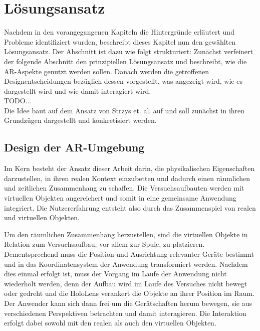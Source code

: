 \section{Lösungsansatz}
\label{sec-4}
Nachdem in den vorangegangenen Kapiteln die Hintergründe erläutert und Probleme identifiziert wurden, beschreibt dieses Kapitel nun den gewählten Lösungsansatz. Der Abschnitt ist dazu wie folgt strukturiert:
Zunächst verfeinert der folgende Abschnitt den prinzipiellen Lösungsansatz und beschreibt, wie die AR-Aspekte genutzt werden sollen. Danach werden die getroffenen Designentscheidungen bezüglich dessen vorgestellt, was angezeigt wird, wie es dargestellt wird und wie damit interagiert wird.\\

TODO...\\
Die Idee baut auf dem Ansatz von Strzys et. al. auf und soll zunächst in ihren Grundzügen dargestellt und konkretisiert werden.

\subsection{Design der AR-Umgebung}
\label{sec-4-1}
Im Kern besteht der Ansatz dieser Arbeit darin, die physikalischen Eigenschaften darzustellen, in ihren realen Kontext einzubetten und dadurch einen räumlichen und zeitlichen Zusammenhang zu schaffen. Die Versuchsaufbauten werden mit virtuellen Objekten angereichert und somit in eine gemeinsame Anwendung integriert. Die Nutzererfahrung entsteht also durch das Zusammenspiel von realen und virtuellen Objekten.


Um den räumlichen Zusammenhang herzustellen, sind die virtuellen Objekte in Relation zum Versuchsaufbau, vor allem zur Spule, zu platzieren. Dementsprechend muss die Position und Ausrichtung relevanter Geräte bestimmt und in das Koordinatensystem der Anwendung transformiert werden. Nachdem dies einmal erfolgt ist, muss der Vorgang im Laufe der Anwendung nicht wiederholt werden, denn der Aufbau wird im Laufe des Versuches nicht bewegt oder gedreht und die HoloLens verankert die Objekte an ihrer Position im Raum. Der Anwender kann sich dann frei um die Gerätschaften herum bewegen, sie aus verschiedenen Perspektiven betrachten und damit interagieren. Die Interaktion erfolgt dabei sowohl mit den realen als auch den virtuellen Objekten.\\


